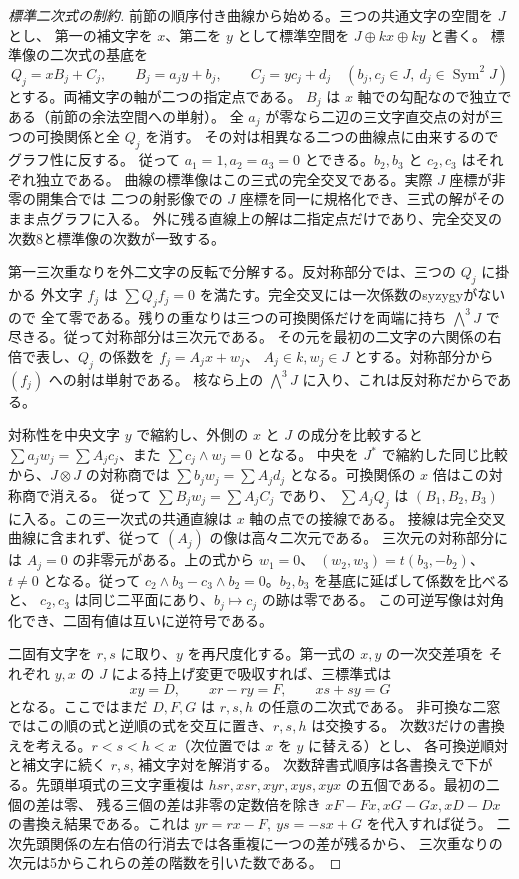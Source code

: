 \begin{proof}[標準二次式の制約]
前節の順序付き曲線から始める。三つの共通文字の空間を $J$ とし、
第一の補文字を $x$、第二を $y$ として標準空間を $J\oplus kx\oplus ky$ と書く。
標準像の二次式の基底を
\[
 Q_j=xB_j+C_j,\qquad B_j=a_j y+b_j,\qquad C_j=y c_j+d_j
 \quad(b_j,c_j\in J,\ d_j\in\operatorname{Sym}^2 J)
\]
とする。両補文字の軸が二つの指定点である。
$B_j$ は $x$ 軸での勾配なので独立である（前節の余法空間への単射）。
全 $a_j$ が零なら二辺の三文字直交点の対が三つの可換関係と全 $Q_j$ を消す。
その対は相異なる二つの曲線点に由来するのでグラフ性に反する。
従って $a_1=1,a_2=a_3=0$ とできる。$b_2,b_3$ と $c_2,c_3$ はそれぞれ独立である。
曲線の標準像はこの三式の完全交叉である。実際 $J$ 座標が非零の開集合では
二つの射影像での $J$ 座標を同一に規格化でき、三式の解がそのまま点グラフに入る。
外に残る直線上の解は二指定点だけであり、完全交叉の次数8と標準像の次数が一致する。

第一三次重なりを外二文字の反転で分解する。反対称部分では、三つの $Q_j$ に掛かる
外文字 $f_j$ は $\sum Q_j f_j=0$ を満たす。完全交叉には一次係数のsyzygyがないので
全て零である。残りの重なりは三つの可換関係だけを両端に持ち
$\bigwedge^3J$ で尽きる。従って対称部分は三次元である。
その元を最初の二文字の六関係の右倍で表し、$Q_j$ の係数を $f_j=A_jx+w_j$、
$A_j\in k,w_j\in J$ とする。対称部分から $(f_j)$ への射は単射である。
核なら上の $\bigwedge^3J$ に入り、これは反対称だからである。

対称性を中央文字 $y$ で縮約し、外側の $x$ と $J$ の成分を比較すると
$\sum a_j w_j=\sum A_j c_j$、また $\sum c_j\wedge w_j=0$ となる。
中央を $J^*$ で縮約した同じ比較から、$J\otimes J$ の対称商では
$\sum b_j w_j=\sum A_j d_j$ となる。可換関係の $x$ 倍はこの対称商で消える。
従って $\sum B_j w_j=\sum A_j C_j$ であり、
$\sum A_j Q_j$ は $(B_1,B_2,B_3)$ に入る。この三一次式の共通直線は $x$ 軸の点での接線である。
接線は完全交叉曲線に含まれず、従って $(A_j)$ の像は高々二次元である。
三次元の対称部分には $A_j=0$ の非零元がある。上の式から $w_1=0$、
$(w_2,w_3)=t(b_3,-b_2)$、$t\ne0$ となる。従って
$c_2\wedge b_3-c_3\wedge b_2=0$。$b_2,b_3$ を基底に延ばして係数を比べると、
$c_2,c_3$ は同じ二平面にあり、$b_j\mapsto c_j$ の跡は零である。
この可逆写像は対角化でき、二固有値は互いに逆符号である。

二固有文字を $r,s$ に取り、$y$ を再尺度化する。第一式の $x,y$ の一次交差項を
それぞれ $y,x$ の $J$ による持上げ変更で吸収すれば、三標準式は
\[
 xy=D,\qquad xr-r y=F,\qquad xs+s y=G
\]
となる。ここではまだ $D,F,G$ は $r,s,h$ の任意の二次式である。
非可換な二窓ではこの順の式と逆順の式を交互に置き、$r,s,h$ は交換する。
次数3だけの書換えを考える。$r<s<h<x$（次位置では $x$ を $y$ に替える）とし、
各可換逆順対と補文字に続く $r,s$, 補文字対を解消する。
次数辞書式順序は各書換えで下がる。先頭単項式の三文字重複は
$hsr,xsr,xyr,xys,xyx$ の五個である。最初の二個の差は零、
残る三個の差は非零の定数倍を除き
$xF-Fx,xG-Gx,xD-Dx$ の書換え結果である。これは $yr=rx-F,\ ys=-sx+G$ を代入すれば従う。
二次先頭関係の左右倍の行消去では各重複に一つの差が残るから、
三次重なりの次元は5からこれらの差の階数を引いた数である。


\end{proof}
